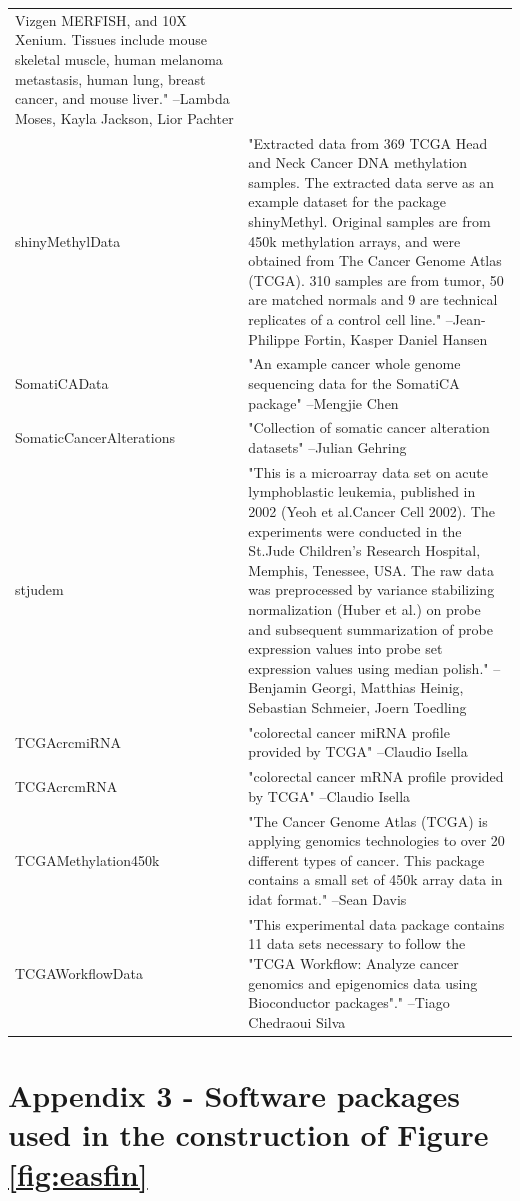 \begin{longtable}[t]{l>{\raggedright\arraybackslash}p{25em}}
Vizgen MERFISH, and 10X Xenium. Tissues include mouse skeletal
muscle, human melanoma metastasis, human lung, breast cancer,
and mouse liver." --Lambda Moses, Kayla Jackson, Lior Pachter\\
\addlinespace
shinyMethylData & "Extracted data from 369 TCGA Head and Neck Cancer DNA
methylation samples. The extracted data serve as an example
dataset for the package shinyMethyl. Original samples are from
450k methylation arrays, and were obtained from The Cancer
Genome Atlas (TCGA). 310 samples are from tumor, 50 are matched
normals and 9 are technical replicates of a control cell line." --Jean-Philippe Fortin, Kasper Daniel Hansen\\
SomatiCAData & "An example cancer whole genome sequencing data for the
SomatiCA package" --Mengjie Chen\\
SomaticCancerAlterations & "Collection of somatic cancer alteration datasets" --Julian Gehring\\
stjudem & "This is a microarray data set on acute lymphoblastic
leukemia, published in 2002 (Yeoh et al.Cancer Cell 2002). The
experiments were conducted in the St.Jude Children's Research
Hospital, Memphis, Tenessee, USA. The raw data was preprocessed
by variance stabilizing normalization (Huber et al.) on probe
and subsequent summarization of probe expression values into
probe set expression values using median polish." --Benjamin Georgi, Matthias Heinig, Sebastian Schmeier, Joern Toedling\\
TCGAcrcmiRNA & "colorectal cancer miRNA profile provided by TCGA" --Claudio Isella\\
\addlinespace
TCGAcrcmRNA & "colorectal cancer mRNA profile provided by TCGA" --Claudio Isella\\
TCGAMethylation450k & "The Cancer Genome Atlas (TCGA) is applying genomics
technologies to over 20 different types of cancer.  This
package contains a small set of 450k array data in idat format." --Sean Davis\\
TCGAWorkflowData & "This experimental data package contains 11 data sets
necessary to follow the "TCGA Workflow: Analyze cancer genomics
and epigenomics data using Bioconductor packages"." --Tiago Chedraoui Silva\\
\bottomrule
\end{longtable}

\newpage

\hypertarget{app3}{%
\section{Appendix 3 - Software packages used in the construction of Figure \ref{fig:easfin}}\label{app3}}

